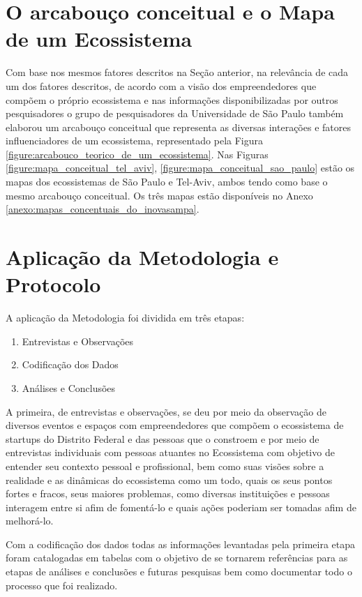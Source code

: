 \section{O arcabouço conceitual e o Mapa de um Ecossistema}
\label{subsection:arcabouco_conceitual_e_modelo}

Com base nos mesmos fatores descritos na Seção anterior, na relevância de cada um dos fatores descritos, de acordo com a visão dos empreendedores que compõem o próprio ecossistema e nas informações disponibilizadas por outros pesquisadores o grupo de pesquisadores da Universidade de São Paulo também elaborou um arcabouço conceitual que representa as diversas interações e fatores influenciadores de um ecossistema, representado pela Figura \ref{figure:arcabouco_teorico_de_um_ecossistema}. Nas Figuras \ref{figure:mapa_conceitual_tel_aviv}, \ref{figure:mapa_conceitual_sao_paulo} estão os mapas dos ecossistemas de São Paulo e Tel-Aviv, ambos tendo como base o mesmo arcabouço conceitual. Os três mapas estão disponíveis no Anexo \ref{anexo:mapas_concentuais_do_inovasampa}.

\section{Aplicação da Metodologia e Protocolo}
\label{section:aplicacao_da_metodologia}

A aplicação da Metodologia foi dividida em três etapas:

\begin{enumerate}
  \item Entrevistas e Observações
  \item Codificação dos Dados
  \item Análises e Conclusões
\end{enumerate}

A primeira, de entrevistas e observações, se deu por meio da observação de diversos eventos e espaços com empreendedores que compõem o ecossistema de startups do Distrito Federal e das pessoas que o constroem e por meio de entrevistas individuais com pessoas atuantes no Ecossistema com objetivo de entender seu contexto pessoal e profissional, bem como suas visões sobre a realidade e as dinâmicas do ecossistema como um todo, quais os seus pontos fortes e fracos, seus maiores problemas, como diversas instituições e pessoas interagem entre si afim de fomentá-lo e quais ações poderiam ser tomadas afim de melhorá-lo.

Com a codificação dos dados todas as informações levantadas pela primeira etapa foram catalogadas em tabelas com o objetivo de se tornarem referências para as etapas de análises e conclusões e futuras pesquisas bem como documentar todo o processo que foi realizado. 

